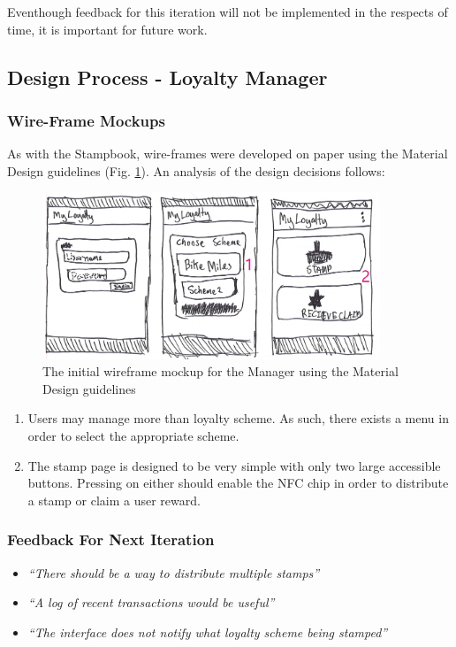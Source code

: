 Eventhough feedback for this iteration will not be implemented in the respects of time, it is important for future work.

\newpage
\subsection{Design Process - Loyalty Manager}
\subsubsection{Wire-Frame Mockups}
As with the Stampbook, wire-frames were developed on paper using the Material Design guidelines (Fig. \ref{fig:wireframem1}). An analysis of the design decisions follows: 
\begin{figure}[H]
 \centering
  \includegraphics[width=0.9\textwidth]{img/Page2.jpg}
    \caption{The initial wireframe mockup for the Manager using the Material Design guidelines}
         \label{fig:wireframem1}
\end{figure}


\begin{enumerate}
  \item Users may manage more than loyalty scheme. As such, there exists a menu in order to select the appropriate scheme.
  \item The stamp page is designed to be very simple with only two large accessible buttons. Pressing on either should enable the NFC chip in order to distribute a stamp or claim a user reward.
\end{enumerate}

\subsubsection{Feedback For Next Iteration}
\begin{itemize}
  \item \textit{``There should be a way to distribute multiple stamps''}
  \item \textit{``A log of recent transactions would be useful''}
  \item \textit{``The interface does not notify what loyalty scheme being stamped''}
\end{itemize}

